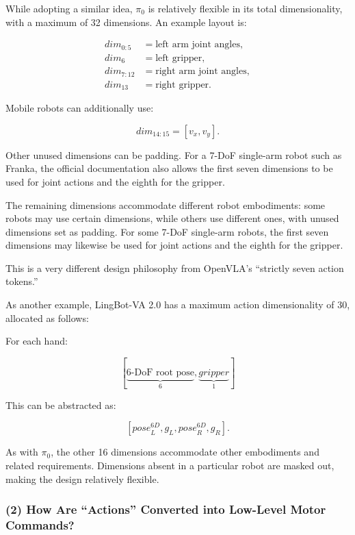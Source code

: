 While adopting a similar idea, \(\pi_0\) is relatively flexible in its total dimensionality, with a maximum of 32 dimensions. An example layout is:

\[
\begin{aligned}
\mathit{dim}_{0:5} &= \text{left arm joint angles},\\
\mathit{dim}_{6} &= \text{left gripper},\\
\mathit{dim}_{7:12} &= \text{right arm joint angles},\\
\mathit{dim}_{13} &= \text{right gripper}.
\end{aligned}
\]

Mobile robots can additionally use:

\[
\mathit{dim}_{14:15}=[v_x,v_y].
\]

Other unused dimensions can be padding. For a 7-DoF single-arm robot such as Franka, the official documentation also allows the first seven dimensions to be used for joint actions and the eighth for the gripper.

The remaining dimensions accommodate different robot embodiments: some robots may use certain dimensions, while others use different ones, with unused dimensions set as padding. For some 7-DoF single-arm robots, the first seven dimensions may likewise be used for joint actions and the eighth for the gripper.

This is a very different design philosophy from OpenVLA's ``strictly seven action tokens.''

As another example, LingBot-VA 2.0 has a maximum action dimensionality of 30, allocated as follows:

For each hand:

\[
[\underbrace{\text{6-DoF root pose}}_{6},\underbrace{\mathit{gripper}}_{1}]
\]

This can be abstracted as:

\[
[\mathit{pose}^{6D}_L,g_L,\mathit{pose}^{6D}_R,g_R].
\]

As with \(\pi_0\), the other 16 dimensions accommodate other embodiments and related requirements. Dimensions absent in a particular robot are masked out, making the design relatively flexible.

\hypertarget{how-are-actions-converted-into-low-level-motor-commands}{%
\subsubsection{(2) How Are ``Actions'' Converted into Low-Level Motor Commands?}\label{how-are-actions-converted-into-low-level-motor-commands}}

